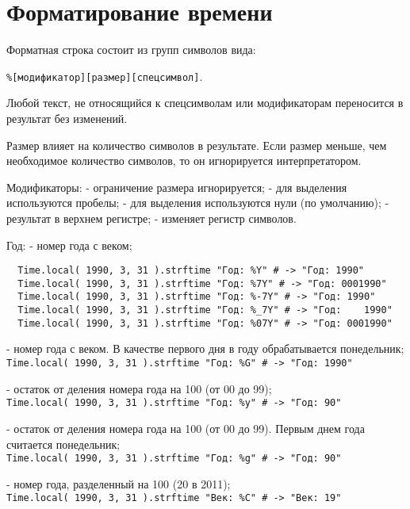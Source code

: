 \hypertarget{appdatetime}{}
\chapter{Форматирование времени}

Форматная строка состоит из групп символов вида:

\medskip\noindent\verb!%[модификатор][размер][спецсимвол]!. 

Любой текст, не относящийся к спецсимволам или модификаторам переносится в результат без изменений. 

Размер влияет на количество символов в результате. Если размер меньше, чем необходимое количество символов, то он игнорируется интерпретатором.

\begin{keylist}{Модификаторы:}
  \firstkey{-} - ограничение размера игнорируется;
  \key{_} - для выделения используются пробелы;
   - для выделения используются нули (по умолчанию);
  \key{\textasciicircum} - результат в верхнем регистре;
  \key{\#} - изменяет регистр символов.
\end{keylist}

\begin{keylist}{Год:}
   - номер года с веком;  
  \begin{verbatim}
  Time.local( 1990, 3, 31 ).strftime "Год: %Y" # -> "Год: 1990"
  Time.local( 1990, 3, 31 ).strftime "Год: %7Y" # -> "Год: 0001990"
  Time.local( 1990, 3, 31 ).strftime "Год: %-7Y" # -> "Год: 1990" 
  Time.local( 1990, 3, 31 ).strftime "Год: %_7Y" # -> "Год:    1990" 
  Time.local( 1990, 3, 31 ).strftime "Год: %07Y" # -> "Год: 0001990"
  \end{verbatim}    
     
   - номер года с веком. В качестве первого дня в году обрабатывается понедельник; 
  \\\verb!Time.local( 1990, 3, 31 ).strftime "Год: %G" # -> "Год: 1990"!
    
   - остаток от деления номера года на 100 (от 00 до 99);  
  \\\verb!Time.local( 1990, 3, 31 ).strftime "Год: %y" # -> "Год: 90"!
    
   - остаток от деления номера года на 100 (от 00 до 99). Первым днем года считается понедельник; 
  \\\verb!Time.local( 1990, 3, 31 ).strftime "Год: %g" # -> "Год: 90"!
    
   - номер года, разделенный на 100 (20 в 2011);  
  \\\verb!Time.local( 1990, 3, 31 ).strftime "Век: %C" # -> "Век: 19"!
\end{keylist}

